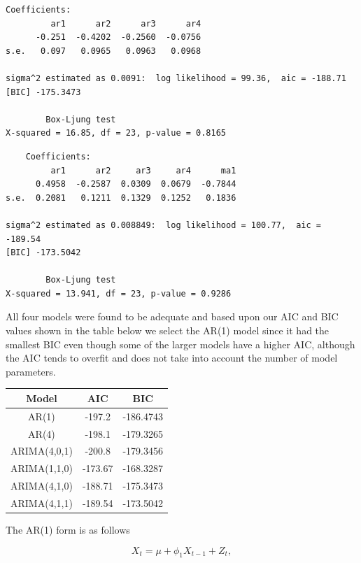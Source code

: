 \documentclass[12pt]{article}
\newenvironment{solution}[2][Solution]{\begin{trivlist}
	\item[\hskip \labelsep {\bfseries #1}]}{\end{trivlist}}
\begin{document}
\begin{solution}{}
\begin{lstlisting}
	\end{lstlisting}	

	\begin{lstlisting}
Coefficients:
         ar1      ar2      ar3      ar4
      -0.251  -0.4202  -0.2560  -0.0756
s.e.   0.097   0.0965   0.0963   0.0968

sigma^2 estimated as 0.0091:  log likelihood = 99.36,  aic = -188.71
[BIC] -175.3473

        Box-Ljung test
X-squared = 16.85, df = 23, p-value = 0.8165
	\end{lstlisting}
	
	
	\begin{lstlisting}
	Coefficients:
         ar1      ar2     ar3     ar4      ma1
      0.4958  -0.2587  0.0309  0.0679  -0.7844
s.e.  0.2081   0.1211  0.1329  0.1252   0.1836

sigma^2 estimated as 0.008849:  log likelihood = 100.77,  aic = -189.54
[BIC] -173.5042

        Box-Ljung test
X-squared = 13.941, df = 23, p-value = 0.9286	
        \end{lstlisting}


	All four models were found to be adequate and based upon our AIC and BIC values shown in the table below we select the AR(1) model since it had the smallest BIC even though some of the larger models have a higher AIC, although the AIC tends to overfit and does not take into account the number of model parameters. 
	
	\begin{center}
	\begin{tabular}{ |c|c|c| } 
	\hline
	Model & AIC & BIC \\
	\hline
 	AR(1) & -197.2 & -186.4743 \\ 
 	AR(4) & -198.1 & -179.3265 \\ 
	ARIMA(4,0,1) & -200.8 & -179.3456 \\
 	ARIMA(1,1,0) & -173.67 & -168.3287 \\ 
	ARIMA(4,1,0) & -188.71 & -175.3473 \\ 
	ARIMA(4,1,1) & -189.54 & -173.5042 \\
 	\hline
	\end{tabular}
	\end{center}

	\newpage

	The AR(1) form is as follows
	
	\begin{equation*}
	X_t = \mu + \phi_1 X_{t-1} + Z_t,
	\end{equation*}
	

\end{solution}
\end{document}
